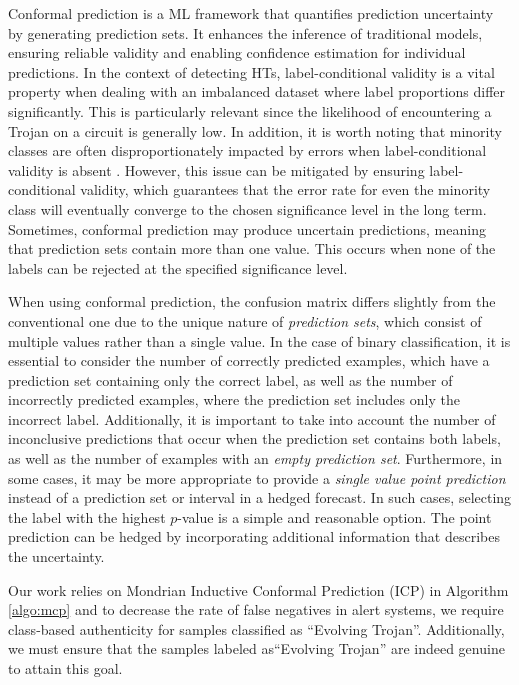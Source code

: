 \documentclass[9pt,conference]{IEEEtran}
\begin{document}
Conformal prediction \cite{shafer2008tutorial} is a ML framework that quantifies prediction uncertainty by generating prediction sets. It enhances the inference of traditional models, ensuring reliable validity and enabling confidence estimation for individual predictions. In the context of detecting HTs, label-conditional validity is a vital property when dealing with an imbalanced dataset where label proportions differ significantly. This is particularly relevant since the likelihood of encountering a Trojan on a circuit is generally low. In addition, it is worth noting that minority classes are often disproportionately impacted by errors when label-conditional validity is absent \cite{lofstrom2015bias}. However, this issue can be mitigated by ensuring label-conditional validity, which guarantees that the error rate for even the minority class will eventually converge to the chosen significance level in the long term. Sometimes, conformal prediction may produce uncertain predictions, meaning that prediction sets contain more than one value. This occurs when none of the labels can be rejected at the specified significance level.

When using conformal prediction, the confusion matrix differs slightly from the conventional one due to the unique nature of \textit{prediction sets}, which consist of multiple values rather than a single value. In the case of binary classification, it is essential to consider the number of correctly predicted examples, which have a prediction set containing only the correct label, as well as the number of incorrectly predicted examples, where the prediction set includes only the incorrect label. Additionally, it is important to take into account the number of inconclusive predictions that occur when the prediction set contains both labels, as well as the number of examples with an \textit{empty prediction set}. Furthermore, in some cases, it may be more appropriate to provide a \textit{single value point prediction} instead of a prediction set or interval in a hedged forecast. In such cases, selecting the label with the highest $p$-value is a simple and reasonable option. The point prediction can be hedged by incorporating additional information that describes the uncertainty.

Our work relies on Mondrian Inductive Conformal Prediction (ICP) \cite{bostrom2021mondrian} in Algorithm \ref{algo:mcp} and to decrease the rate of false negatives in alert systems, we require class-based authenticity for samples classified as ``Evolving Trojan''. Additionally, we must ensure that the samples labeled as``Evolving Trojan'' are indeed genuine to attain this goal.
\end{document}
